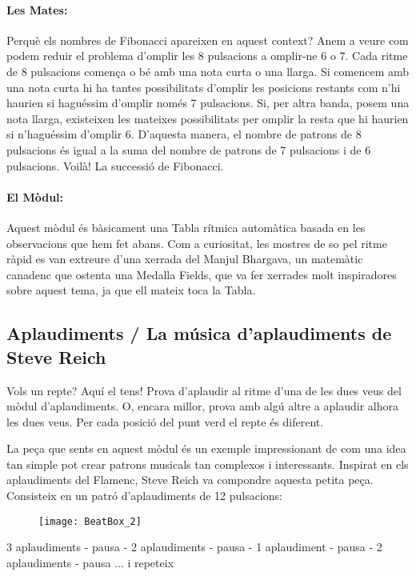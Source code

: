\paragraph{Les Mates:}
Perquè els nombres de Fibonacci apareixen en aquest context? Anem a veure com podem reduir el problema d'omplir les 8 pulsacions a omplir-ne 6 o 7. Cada ritme de 8 pulsacions comença o bé amb una nota curta o una llarga.  Si comencem amb una nota curta hi ha tantes possibilitats d'omplir les posicions restants com n'hi haurien si haguéssim d'omplir només 7 pulsacions. Si, per altra banda, posem una nota llarga, existeixen les mateixes possibilitats per omplir la resta que hi haurien si n'haguéssim d'omplir 6. D'aquesta manera, el nombre de patrons de 8 pulsacions és igual a la suma del nombre de patrons de 7 pulsacions i de 6 pulsacions. Voilà! La successió de Fibonacci.

\paragraph{El Mòdul:} Aquest mòdul és bàsicament una Tabla rítmica automàtica basada en les observacions que hem fet abans. Com a curiositat, les mostres de so pel ritme ràpid es van extreure d'una xerrada del Manjul Bhargava, un matemàtic canadenc que ostenta una Medalla Fields, que va fer xerrades molt inspiradores sobre aquest tema, ja que ell mateix toca la Tabla.

\subsection{Aplaudiments  / La música d'aplaudiments de Steve Reich}
Vols un repte? Aquí el tens! Prova d'aplaudir al ritme d'una de les dues veus del mòdul d'aplaudiments. O, encara millor, prova amb algú altre a aplaudir alhora les dues veus. Per cada posició del punt verd el repte és diferent.

La peça que sents en aquest mòdul és un exemple impressionant de com una idea tan simple pot  crear patrons musicals tan complexos i interessants. Inspirat en els aplaudiments del Flamenc, Steve Reich va compondre aquesta petita peça. Consisteix en un patró d'aplaudiments de 12 pulsacions:


\begin{figure}[h]
\centering
\texttt{[image: BeatBox\_2]}
\end{figure}

3 aplaudiments - pausa - 2 aplaudiments - pausa - 1 aplaudiment - pausa - 2 aplaudiments  - pausa ... i repeteix

